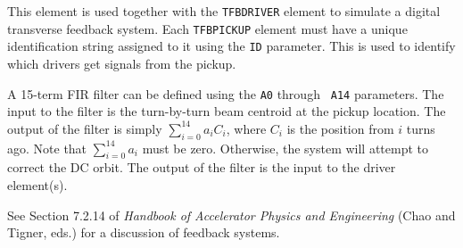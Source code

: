 This element is used together with the {\tt TFBDRIVER} element to
simulate a digital transverse feedback system.  Each {\tt TFBPICKUP}
element must have a unique identification string assigned to it using
the {\tt ID} parameter.  This is used to identify which drivers get
signals from the pickup.

A 15-term FIR filter can be defined using the {\tt A0} through {\tt
A14} parameters.  The input to the filter is the turn-by-turn beam
centroid at the pickup location.  The output of the filter is simply
$\sum_{i=0}^{14} a_i C_i$, where $C_i$ is the position from $i$ turns
ago.  Note that $\sum_{i=0}^{14} a_i$ must be zero. Otherwise, the
system will attempt to correct the DC orbit.  The output of the filter
is the input to the driver element(s).

See Section 7.2.14 of {\em Handbook of Accelerator Physics and Engineering}
(Chao and Tigner, eds.) for a discussion of feedback systems.
